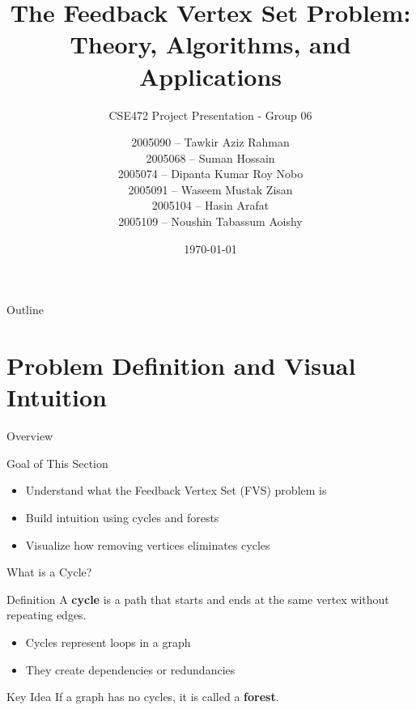 \documentclass[aspectratio=169]{beamer}
\title[Feedback Vertex Set]{The Feedback Vertex Set Problem:\\Theory, Algorithms, and Applications}
\subtitle{CSE472 Project Presentation - Group 06}
\author[Group 06]{
    2005090 -- Tawkir Aziz Rahman \\ 
    2005068 -- Suman Hossain \\ 
    2005074 -- Dipanta Kumar Roy Nobo \\ 
    2005091 -- Waseem Mustak Zisan \\ 
    2005104 -- Hasin Arafat \\ 
    2005109 -- Noushin Tabassum Aoishy
}
\institute[CSE, BUET]{Bangladesh University of Engineering and Technology \\ Department of CSE}
\date{\today}
\begin{document}
\begin{frame}
	\titlepage
\end{frame}

\begin{frame}{Outline}
	\tableofcontents
\end{frame}














\section{Problem Definition and Visual Intuition}

\begin{frame}{Overview}
	\begin{block}{Goal of This Section}
		\begin{itemize}
			\item Understand what the Feedback Vertex Set (FVS) problem is
			\item Build intuition using cycles and forests
			\item Visualize how removing vertices eliminates cycles
		\end{itemize}
	\end{block}
\end{frame}

\begin{frame}{What is a Cycle?}

	\begin{block}{Definition}
		A \textbf{cycle} is a path that starts and ends at the same vertex without repeating edges.
	\end{block}

	\vspace{0.3cm}

	\begin{itemize}
		\item Cycles represent loops in a graph
		\item They create dependencies or redundancies
	\end{itemize}

	\vspace{0.3cm}

	\begin{alertblock}{Key Idea}
		If a graph has no cycles, it is called a \textbf{forest}.
	\end{alertblock}

\end{frame}
\end{document}
